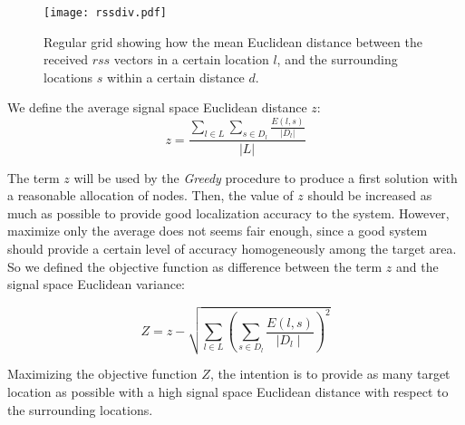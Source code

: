 \begin{figure}[h!tb]
\centering\texttt{[image: rssdiv.pdf]}
\caption{Regular grid showing how the mean Euclidean distance between the received $rss$ vectors in a certain location \(l\), and the surrounding locations $s$ within a certain distance \(d\).}
\label{fig:rssdiv}
\end{figure}

We define the average signal space Euclidean distance $z$:
\begin{equation}\label{eq:z1}
z = \frac{ \sum\limits_{l \in L} \sum\limits_{s \in D_l}\frac{E(l,s)}{|D_l|}}{|L|}
\end{equation}

The term $z$ will be used by the \emph{Greedy} procedure to produce a first solution with a reasonable allocation of nodes. Then, the value of $z$ should be increased as much as possible to provide good localization accuracy to the system. However, maximize only the average does not seems fair enough, since a good system should provide a certain level of accuracy homogeneously among the target area. So we defined the objective function as difference between the term $z$ and the signal space Euclidean variance:

\begin{equation}\label{eq:Z1}
Z = z - \sqrt{\sum\limits_{l\in L}\left(\sum\limits_{s\in D_l}\frac{E(l,s)}{\mid D_l \mid}\right)^2}
\end{equation}

Maximizing the objective function $Z$, the intention is to provide as many target location as possible with a high signal space Euclidean distance with respect to the surrounding locations.


